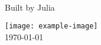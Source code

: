 \begin{titlingpage}
\begin{center}
\vspace*{2cm}\noindent

\Huge \textbf{  \DocMainTitle  }
\\[0.6cm]

{\LARGE  Built by Julia \JuliaVersion }
\vspace*{3cm}\par\noindent

\textbf{  \DocAuthors  }
\vfill

\texttt{[image: example-image]}
\\[1.5cm]

\Large
\deprecatedEnvTravisTag
\today

\end{center}
\end{titlingpage}